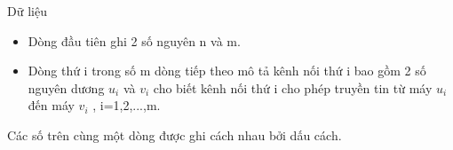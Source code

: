 Dữ liệu  
\begin{itemize}
	\item     Dòng đầu tiên ghi 2 số nguyên n và m.   
	\item     Dòng thứ i trong số m dòng tiếp theo mô tả kênh nối thứ i bao gồm 2 số nguyên dương $u_{i}$    và $v_{i}$    cho biết kênh nối thứ i cho phép truyền tin từ máy $u_{i}$    đến máy $v_{i}$    , i=1,2,...,m.   
\end{itemize}

   Các số trên cùng một dòng được ghi cách nhau bởi dấu cách.